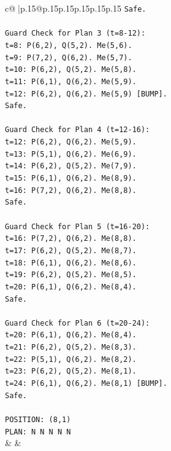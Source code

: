 \documentclass{article}
\begin{document}
{\begin{supertabular}{c@{$\;$}|p{.15\linewidth}@{}p{.15\linewidth}p{.15\linewidth}p{.15\linewidth}p{.15\linewidth}p{.15\linewidth}}
{{{\texttt{Safe.} \\
\\ 
\texttt{Guard Check for Plan 3 (t=8{-}12):} \\
\texttt{t=8: P(6,2), Q(5,2). Me(5,6).} \\
\texttt{t=9: P(7,2), Q(6,2). Me(5,7).} \\
\texttt{t=10: P(6,2), Q(5,2). Me(5,8).} \\
\texttt{t=11: P(6,1), Q(6,2). Me(5,9).} \\
\texttt{t=12: P(6,2), Q(6,2). Me(5,9) {[}BUMP{]}.} \\
\texttt{Safe.} \\
\\ 
\texttt{Guard Check for Plan 4 (t=12{-}16):} \\
\texttt{t=12: P(6,2), Q(6,2). Me(5,9).} \\
\texttt{t=13: P(5,1), Q(6,2). Me(6,9).} \\
\texttt{t=14: P(6,2), Q(5,2). Me(7,9).} \\
\texttt{t=15: P(6,1), Q(6,2). Me(8,9).} \\
\texttt{t=16: P(7,2), Q(6,2). Me(8,8).} \\
\texttt{Safe.} \\
\\ 
\texttt{Guard Check for Plan 5 (t=16{-}20):} \\
\texttt{t=16: P(7,2), Q(6,2). Me(8,8).} \\
\texttt{t=17: P(6,2), Q(5,2). Me(8,7).} \\
\texttt{t=18: P(6,1), Q(6,2). Me(8,6).} \\
\texttt{t=19: P(6,2), Q(5,2). Me(8,5).} \\
\texttt{t=20: P(6,1), Q(6,2). Me(8,4).} \\
\texttt{Safe.} \\
\\ 
\texttt{Guard Check for Plan 6 (t=20{-}24):} \\
\texttt{t=20: P(6,1), Q(6,2). Me(8,4).} \\
\texttt{t=21: P(6,2), Q(5,2). Me(8,3).} \\
\texttt{t=22: P(5,1), Q(6,2). Me(8,2).} \\
\texttt{t=23: P(6,2), Q(5,2). Me(8,1).} \\
\texttt{t=24: P(6,1), Q(6,2). Me(8,1) {[}BUMP{]}.} \\
\texttt{Safe.} \\
\\ 
\texttt{POSITION: (8,1)} \\
\texttt{PLAN: N N N N N} \\
            }
        }
    }
    & & \\ \\


\end{supertabular}}
\end{document}
